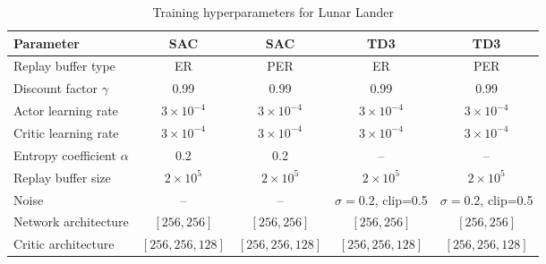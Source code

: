 \documentclass[11pt]{article}
\begin{document}
\begin{table}[htbp]
\renewcommand{\arraystretch}{0.85}
\centering
\caption{Training hyperparameters for Lunar Lander}
\vspace{-0.3cm}
\begin{tabular}{lcccc}
\toprule
\textbf{Parameter} 
& \textbf{SAC} 
& \textbf{SAC}
& \textbf{TD3}
& \textbf{TD3} \\
\midrule

Replay buffer type
& ER & PER & ER & PER \\


Discount factor $\gamma$
& 0.99 & 0.99 & 0.99 & 0.99 \\

Actor learning rate
& $3\times10^{-4}$ & $3\times10^{-4}$ 
& $3\times10^{-4}$ & $3\times10^{-4}$ \\

Critic learning rate
& $3\times10^{-4}$ & $3\times10^{-4}$ 
& $3\times10^{-4}$ & $3\times10^{-4}$ \\

Entropy coefficient $\alpha$
& 0.2 & 0.2 & -- & -- \\

Replay buffer size
& $2\times10^5$ & $2\times10^5$ & $2\times10^5$ & $2\times10^5$ \\

Noise
& -- & -- & 
$\sigma=0.2$, \newline clip=0.5 
& $\sigma=0.2$, \newline clip=0.5 \\

Network architecture
& $[256,256]$ & $[256,256]$ 
& $[256,256]$ & $[256,256]$ \\

Critic architecture
& $[256,256,128]$ & $[256,256,128]$ 
& $[256,256,128]$ & $[256,256,128]$ \\

\bottomrule
\end{tabular}
\end{table}
\end{document}
